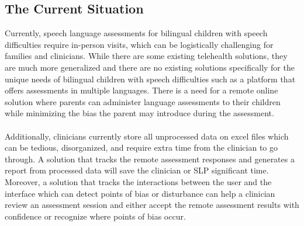 \documentclass[12pt]{article}
\begin{document}
\subsection{The Current Situation}
\hspace{2em}Currently, speech language assessments for bilingual children with speech difficulties require in-person visits, which can be logistically challenging 
for families and clinicians. While there are some existing telehealth solutions, they are much more generalized and there are no existing solutions 
specifically for the unique needs of bilingual children with speech difficulties such as a platform that offers assessments in multiple languages. 
There is a need for a remote online solution where parents can administer language assessments to their children while minimizing the bias the parent 
may introduce during the assessment. \\\\
\indent Additionally, clinicians currently store all unprocessed data on excel files which can be tedious, disorganized, and require extra time from the clinician 
to go through. A solution that tracks the remote assessment responses and generates a report from processed data will save the clinician or SLP significant 
time. Moreover, a solution that tracks the interactions between the user and the interface which can detect points of bias or disturbance can help a clinician 
review an assessment session and either accept the remote assessment results with confidence or recognize where points of bias occur.

\newpage
\end{document}
